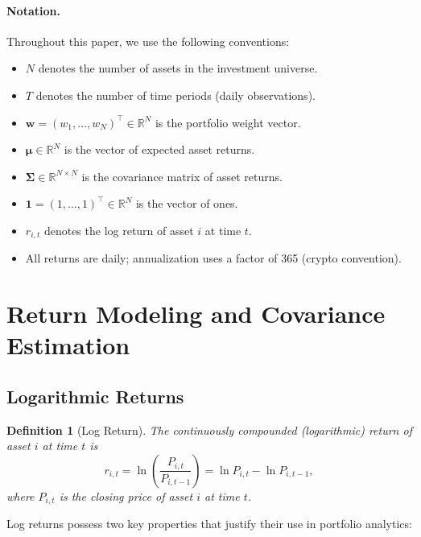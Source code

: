 \documentclass[12pt,a4paper]{article}
\newtheorem{definition}{Definition}[section]
\newcommand{\R}{\mathbb{R}}
\begin{document}
\paragraph{Notation.} Throughout this paper, we use the following conventions:
\begin{itemize}[nosep]
    \item $N$ denotes the number of assets in the investment universe.
    \item $T$ denotes the number of time periods (daily observations).
    \item $\bm{w} = (w_1, \ldots, w_N)^\top \in \R^N$ is the portfolio weight vector.
    \item $\bm{\mu} \in \R^N$ is the vector of expected asset returns.
    \item $\bm{\Sigma} \in \R^{N \times N}$ is the covariance matrix of asset returns.
    \item $\bm{1} = (1, \ldots, 1)^\top \in \R^N$ is the vector of ones.
    \item $r_{i,t}$ denotes the log return of asset $i$ at time $t$.
    \item All returns are daily; annualization uses a factor of 365 (crypto convention).
\end{itemize}

\section{Return Modeling and Covariance Estimation}
\label{sec:returns}

\subsection{Logarithmic Returns}

\begin{definition}[Log Return]
The continuously compounded (logarithmic) return of asset $i$ at time $t$ is
\begin{equation}
    r_{i,t} = \ln\!\left(\frac{P_{i,t}}{P_{i,t-1}}\right) = \ln P_{i,t} - \ln P_{i,t-1},
    \label{eq:log-return}
\end{equation}
where $P_{i,t}$ is the closing price of asset $i$ at time $t$.
\end{definition}

Log returns possess two key properties that justify their use in portfolio analytics:
\end{document}
